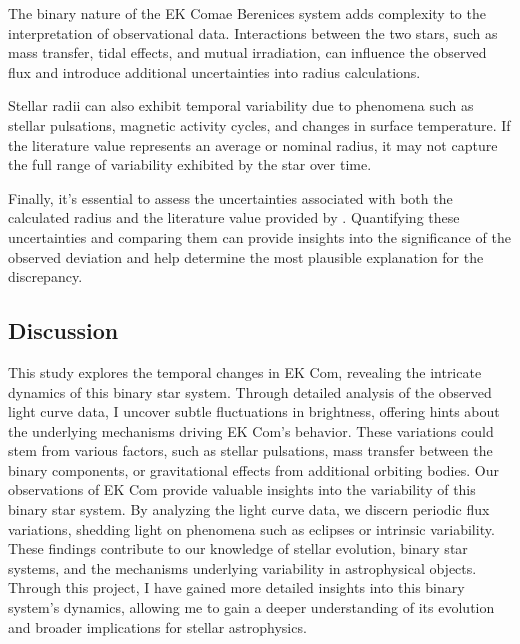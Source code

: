 \documentclass[]{aastex63}
\begin{document}
The binary nature of the EK Comae Berenices system adds complexity to the interpretation of observational data. Interactions between the two stars, such as mass transfer, tidal effects, and mutual irradiation, can influence the observed flux and introduce additional uncertainties into radius calculations.

Stellar radii can also exhibit temporal variability due to phenomena such as stellar pulsations, magnetic activity cycles, and changes in surface temperature. If the literature value represents an average or nominal radius, it may not capture the full range of variability exhibited by the star over time.

Finally, it's essential to assess the uncertainties associated with both the calculated radius and the literature value provided by \cite{Deb}. Quantifying these uncertainties and comparing them can provide insights into the significance of the observed deviation and help determine the most plausible explanation for the discrepancy.


\subsection{Discussion}
This study explores the temporal changes in EK Com, revealing the intricate dynamics of this binary star system. Through detailed analysis of the observed light curve data, I uncover subtle fluctuations in brightness, offering hints about the underlying mechanisms driving EK Com's behavior. These variations could stem from various factors, such as stellar pulsations, mass transfer between the binary components, or gravitational effects from additional orbiting bodies.
Our observations of EK Com provide valuable insights into the variability of this binary star system. By analyzing the light curve data, we discern periodic flux variations, shedding light on phenomena such as eclipses or intrinsic variability. These findings contribute to our knowledge of stellar evolution, binary star systems, and the mechanisms underlying variability in astrophysical objects. Through this project, I have gained more detailed insights into this binary system's dynamics, allowing me to gain a deeper understanding of its evolution and broader implications for stellar astrophysics.





\end{document}
